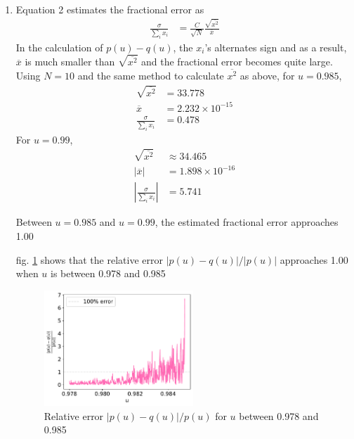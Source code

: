 \documentclass{article}
\begin{document}
\begin{enumerate}
\begin{enumerate}
    \item Equation 2 estimates the fractional error as
    \begin{align*}
        \frac{\sigma}{\sum_i x_i} &= \frac{C}{\sqrt{N}}\frac{\sqrt{\overline{x^2}}}{\overline{x}}
    \end{align*}
    In the calculation of $p(u)-q(u)$, the $x_i$'s alternates sign and as a result, $\overline{x}$ is much smaller than $\sqrt{\overline{x^2}}$ and the fractional error becomes quite large. 
    Using $N=10$ and the same method to calculate $\overline{x^2}$ as above, for $u=0.985$,
    \begin{align*}
        \sqrt{\overline{x^2}} &= 33.778\\
        \overline{x} &= 2.232\times 10^{-15}\\
        \frac{\sigma}{\sum_i x_i} &= 0.478
    \end{align*}
    For $u=0.99$,
    \begin{align*}
        \sqrt{\overline{x^2}} &\approx 34.465\\
        |\overline{x}| &= 1.898 \times 10^{-16}\\
        |\frac{\sigma}{\sum_i x_i}| &= 5.741
    \end{align*}

    Between $u=0.985$ and $u=0.99$, the estimated fractional error approaches 1.00

    fig. \ref{fig:3c} shows that the relative error $|p(u)-q(u)|/|p(u)|$ approaches 1.00 when $u$ is between 0.978 and 0.985

    \begin{figure}[h]
        \centering
        \includegraphics[width=0.53\textwidth]{3c.pdf}
        \caption{Relative error $|p(u)-q(u)|/p(u)$ for $u$ between 0.978 and 0.985}
        \label{fig:3c}
    \end{figure}


\end{enumerate}
\end{enumerate}
\end{document}
